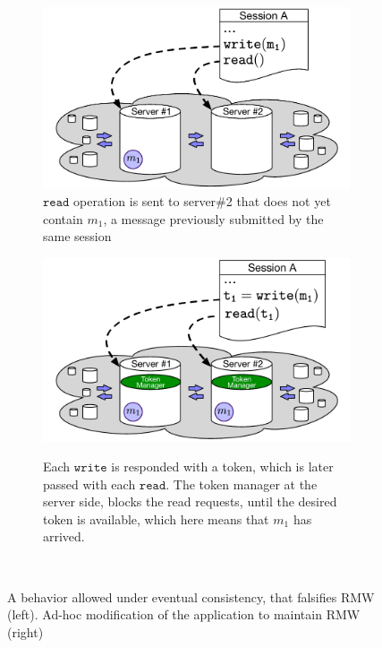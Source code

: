 \begin{figure}
\centering
\begin{subfigure}[t]{0.48\textwidth}
\begin{center}
\includegraphics[scale=0.45]{../Figures/System_example.pdf}
\end{center}
\label{fig:rmw_falsified} \vspace{0 mm}
\caption{ $\mathtt{read}$ operation is sent to server\#2 that does not yet
contain $m_1$, a message previously submitted by the same session}
\end{subfigure}\quad
\begin{subfigure}[t]{0.48\textwidth}
\includegraphics[scale=0.45]{../Figures/System_example_adhoc.pdf}
\label{fig:addhoc_impl}
\caption{Each $\mathtt{write}$ is responded with a token, which is later
passed with each $\mathtt{read}$. The token manager at the server side,
blocks the read requests, until the desired token is available, which
here means that $m_1$ has arrived. }
\end{subfigure}
\\ \hrulefill 
\caption {A behavior allowed under eventual consistency, that
falsifies RMW (left).  Ad-hoc modification of the application to
maintain RMW (right)}


\end{figure}


